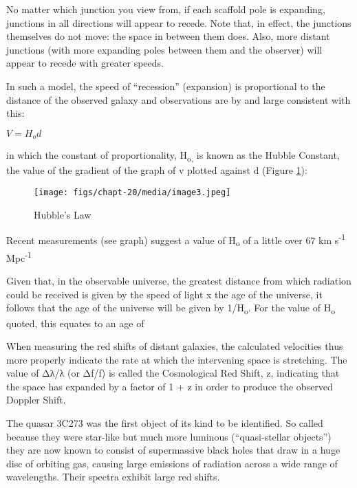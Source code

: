 \documentclass[revision-guide.tex]{subfiles}
\begin{document}
No matter which junction you view from, if each scaffold pole is
expanding, junctions in all directions will appear to recede. Note that,
in effect, the junctions themselves do not move: the space in between
them does. Also, more distant junctions (with more expanding poles
between them and the observer) will appear to recede with greater
speeds.

In such a model, the speed of ``recession'' (expansion) is proportional
to the distance of the observed galaxy and observations are by and large
consistent with this:

$ V = H_{o} d$

in which the constant of proportionality, H\textsubscript{o,} is known
as the Hubble Constant, the value of the gradient of the graph of v
plotted against d (Figure \ref{hubble-law}):

\begin{figure}[h]
\texttt{[image: figs/chapt-20/media/image3.jpeg]}
\caption{Hubble's Law}
\label{hubble-law}
\end{figure}

Recent measurements (see graph) suggest a value of H\textsubscript{o} of
a little over 67 km s\textsuperscript{-1} Mpc\textsuperscript{-1}

Given that, in the observable universe, the greatest distance from which
radiation could be received is given by the speed of light x the age of
the universe, it follows that the age of the universe will be given by
1/H\textsubscript{o}. For the value of H\textsubscript{o} quoted, this
equates to an age of

When measuring the red shifts of distant galaxies, the calculated
velocities thus more properly indicate the rate at which the intervening
space is stretching. The value of Δλ/λ (or Δf/f) is called the
Cosmological Red Shift, z, indicating that the space has expanded by a
factor of 1 + z in order to produce the observed Doppler Shift.


The quasar 3C273 was the first object of its kind to be identified. So
called because they were star-like but much more luminous
(``quasi-stellar objects'') they are now known to consist of
supermassive black holes that draw in a huge disc of orbiting gas,
causing large emissions of radiation across a wide range of wavelengths.
Their spectra exhibit large red shifts.
\end{document}
